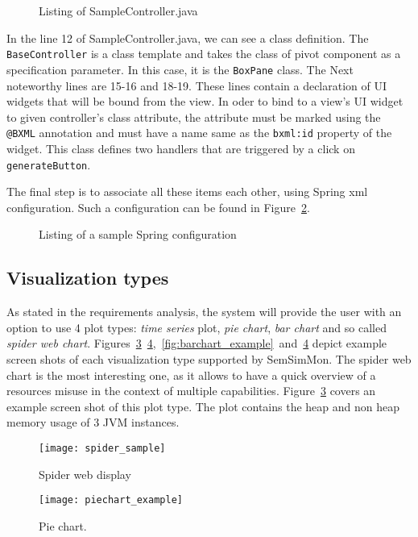 \begin{figure}[ht]
\centering
 
\caption{Listing of SampleController.java}
\label{fig:sample_controller}
\end{figure} 

In the line 12 of SampleController.java, we can see a class definition. The \texttt{BaseController} is a class template and takes the class of pivot component as a specification parameter. In this case, it is the \texttt{BoxPane} class. The Next noteworthy lines are 15-16 and 18-19. These lines contain a declaration of UI widgets that will be bound from the view. In oder to bind to a view\rq{}s UI widget to given controller\rq{}s class attribute, the attribute must be marked using the \texttt{@BXML} annotation and must have a name same as the \texttt{bxml:id} property of the widget. This class defines two handlers that are triggered by a click on \texttt{generateButton}.

The final step is to associate all these items each other, using Spring xml configuration. Such a configuration can be found in Figure~\ref{fig:sample_spring}.

\begin{figure}[ht]
\centering
 
\caption{Listing of a sample Spring configuration}
\label{fig:sample_spring}
\end{figure}

\subsection{Visualization types}

As stated in the requirements analysis, the system will provide the user with an option to use 4 plot types: \emph{time series} plot, \emph{pie chart}, \emph{bar chart} and so called \emph{spider web chart}. Figures~\ref{fig:spider_sample}~\ref{fig:piechart_example},~\ref{fig:barchart_example}~and~\ref{fig:piechart_example} depict example screen shots of each visualization type supported by SemSimMon. The spider web chart is the most interesting one, as it allows to have a quick overview of a resources misuse in the context of multiple capabilities. Figure~\ref{fig:spider_sample} covers an example screen shot of this plot type. The plot contains the heap and non heap memory usage of 3 JVM instances.


\begin{figure}[ht]
\centering
\texttt{[image: spider\_sample]}
\caption{Spider web display}
\label{fig:spider_sample}
\end{figure}
\clearpage
\begin{figure}[ht]
\centering
\texttt{[image: piechart\_example]}
\caption{Pie chart.}
\label{fig:piechart_example}
\end{figure}

